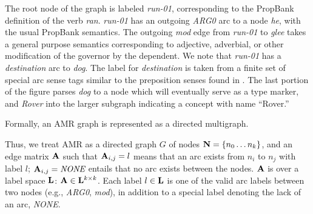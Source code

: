 \documentclass[11pt]{article}
\newcommand\w[1]{\textit{#1}} %
\newcommand\e[1]{\textit{#1}} %
\newcommand\n[1]{\textit{#1}} %
\begin{document}
The root node of the graph is labeled \n{run-01}, corresponding to the PropBank \cite{palmer2005proposition-srl} definition of the verb \w{ran}.
\w{run-01} has an outgoing \e{ARG0} arc to a node \w{he}, with the usual PropBank semantics.
The outgoing \e{mod} edge from \n{run-01} to \n{glee} takes a general purpose semantics corresponding to adjective, adverbial, or other modification of the governor by the dependent.
We note that \n{run-01} has a \e{destination} arc to \n{dog}.
The label for \e{destination} is taken from a finite set of special arc sense tags similar to the preposition senses found in \cite{srikumar2013-srl}.
The last portion of the figure parses \w{dog} to a node which will eventually serve as a type marker, and \w{Rover} into the larger subgraph indicating a concept with name ``Rover.''


Formally, an AMR graph is represented as a directed multigraph.

Thus, we treat AMR as a directed graph $G$ of nodes $\mathbf{N} = \{n_0 \dots n_k\}$, and
  an edge matrix $\mathbf{A}$ such that $\mathbf{A}_{i,j} = l$ means that an arc exists from $n_i$ to $n_j$ with label $l$;
  $\bA_{i,j} = \e{NONE}$ entails that no arc exists between the nodes.
  $\mathbf{A}$ is over a label space $\mathbf{L}$: $\mathbf{A} \in \mathbf{L}^{k \times k}$.
Each label $l \in \mathbf{L}$ is one of the valid arc labels between two nodes (e.g.,
  \e{ARG0}, \e{mod}), in addition to a special label denoting the lack of an arc, \e{NONE}.

\end{document}
